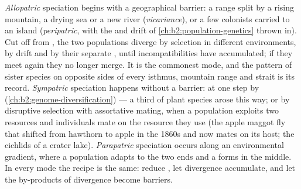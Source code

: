\begin{proposition}\label{prop:b2:speciation:modes}
\emph{Allopatric} speciation begins with a geographical barrier:
a range split by a rising mountain, a drying sea or a new river
(\emph{vicariance}), or a few colonists carried to an island
(\emph{peripatric}, with the  and drift of
\cref{ch:b2:population-genetics} thrown in). Cut off from ,
the two populations diverge by selection in different environments,
by drift and by their separate , until incompatibilities
have accumulated; if they meet again they no longer merge. It is
the commonest mode, and the pattern of sister species on opposite
sides of every isthmus, mountain range and strait is its record.
\emph{Sympatric} speciation happens without a barrier: at one step
by  (\cref{ch:b2:genome-diversification}) --- a third of
plant species arose this way; or by disruptive selection with
assortative mating, when a population exploits two resources and
individuals mate on the resource they use (the apple maggot fly
that shifted from hawthorn to apple in the 1860s and now mates on
its host; the cichlids of a crater lake). \emph{Parapatric}
speciation occurs along an environmental gradient, where a
population adapts to the two ends and a  forms in the
middle. In every mode the recipe is the same: reduce ,
let divergence accumulate, and let the by-products of divergence
become barriers.
\end{proposition}


